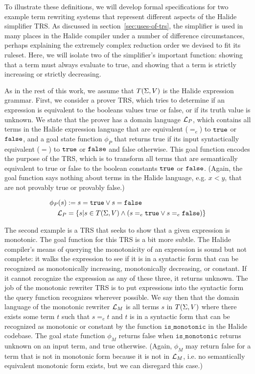 To illustrate these definitions, we will develop formal specifications for two example term rewriting systems that represent different aspects of the Halide simplifier TRS. As discussed in section~\ref{sec:uses-of-trs}, the simplifier is used in many places in the Halide compiler under a number of difference circumstances, perhaps explaining the extremely complex reduction order we devised to fit its ruleset. Here, we will isolate two of the simplifier's important function: showing that a term must always evaluate to true, and showing that a term is strictly increasing or strictly decreasing.

 As in the rest of this work, we assume that $T(\Sigma,V)$ is the Halide expression grammar. First, we consider a prover TRS, which tries to determine if an expression is equivalent to the booleans values true or false, or if its truth value is unknown. We state that the prover has a domain language $\mathcal{L}_P$, which contains all terms in the Halide expression language that are equivalent ($=_e$) to $\texttt{true}$ or $\texttt{false}$, and a goal state function $\phi_P$ that returns true if its input syntactically equivalent ($=$) to $\texttt{true}$ or $\texttt{false}$ and false otherwise. This goal function encodes the purpose of the TRS, which is to transform all terms that are semantically equivalent to true or false to the boolean constants $\texttt{true}$ or $\texttt{false}$. (Again, the goal function says nothing about terms in the Halide language, e.g. $x < y$, that are not provably true or provably false.)

\begin{align*}
    \phi_P(s)& := s = \texttt{true} \vee s = \texttt{false} \\
    \mathcal{L}_P& = \{s | s \in T(\Sigma,V) \wedge (s =_e \texttt{true} \vee s =_e \texttt{false})\} \\
\end{align*}

The second example is a TRS that seeks to show that a given expression is monotonic. The goal function for this TRS is a bit more subtle. The Halide compiler's means of querying the monotonicity of an expression is sound but not complete: it walks the expression to see if it is in a syntactic form that can be recognized as monotonically increasing, monotonically decreasing, or constant. If it cannot recognize the expression as any of these three, it returns unknown. The job of the monotonic rewriter TRS is to put expressions into the syntactic form the query function recognizes wherever possible. We say then that the domain language of the monotonic rewriter $\mathcal{L}_M$ is all terms $s$ in $T(\Sigma,V)$ where there exists some term $t$ such that $s =_e t$ and $t$ is in a syntactic form that can be recognized as monotonic or constant by the function $\texttt{is_monotonic}$ in the Halide codebase. The goal state function $\phi_M$ returns false when $\texttt{is_monotonic}$ returns unknown on an input term, and true otherwise. (Again, $\phi_M$ may return false for a term that is not in monotonic form because it is not in $\mathcal{L}_M$, i.e. no semantically equivalent monotonic form exists, but we can disregard this case.)

